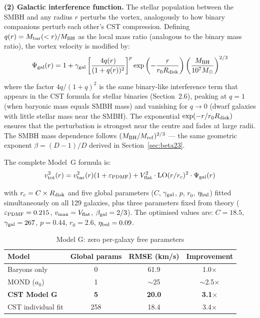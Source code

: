 \documentclass[11pt,a4paper]{article}
\begin{document}
\textbf{(2) Galactic interference function.} The stellar population between the SMBH and any radius $r$ perturbs the vortex, analogously to how binary companions perturb each other's CST compression. Defining $q(r) = M_{\rm bar}(<r)/M_{\rm BH}$ as the local mass ratio (analogous to the binary mass ratio), the vortex velocity is modified by:
\begin{equation}\label{eq:psi_gal}
\Psi_{\rm gal}(r) = 1 + \gamma_{\rm gal} \left[\frac{4q(r)}{(1+q(r))^2}\right]^{p} \exp\left(-\frac{r}{r_0 R_{\rm disk}}\right) \left(\frac{M_{\rm BH}}{10^7 M_\odot}\right)^{2/3}
\end{equation}

where the factor $4q/(1+q)^2$ is the same binary-like interference term that appears in the CST formula for stellar binaries (Section~2.6), peaking at $q = 1$ (when baryonic mass equals SMBH mass) and vanishing for $q \to 0$ (dwarf galaxies with little stellar mass near the SMBH). The exponential $\exp(-r/r_0 R_{\rm disk})$ ensures that the perturbation is strongest near the centre and fades at large radii. The SMBH mass dependence follows $(M_{\rm BH}/M_{\rm ref})^{2/3}$ --- the same geometric exponent $\beta = (D-1)/D$ derived in Section~\ref{sec:beta23}.

The complete Model~G formula is:
\begin{equation}
v_{\rm tot}^2(r) = v_{\rm bar}^2(r)(1 + \varepsilon_{\rm PDMF}) + V_{\rm flat}^2 \cdot {\rm LO}(r/r_c)^2 \cdot \Psi_{\rm gal}(r)
\end{equation}

with $r_c = C \times R_{\rm disk}$ and five global parameters ($C$, $\gamma_{\rm gal}$, $p$, $r_0$, $\eta_{\rm bul}$) fitted simultaneously on all 129 galaxies, plus three parameters fixed from theory ($\varepsilon_{\rm PDMF} = 0.215$, $v_{\rm max} = V_{\rm flat}$, $\beta_{\rm gal} = 2/3$). The optimised values are: $C = 18.5$, $\gamma_{\rm gal} = 267$, $p = 0.44$, $r_0 = 2.6$, $\eta_{\rm bul} = 0.09$.

\begin{table}[h]
\centering
\caption{Model G: zero per-galaxy free parameters}
\begin{tabular}{lccc}
\toprule
Model & Global params & RMSE (km/s) & Improvement \\
\midrule
Baryons only & 0 & 61.9 & 1.0$\times$ \\
MOND ($a_0$) & 1 & $\sim$25 & $\sim$2.5$\times$ \\
\textbf{CST Model G} & \textbf{5} & \textbf{20.0} & \textbf{3.1$\times$} \\
CST individual fit & 258 & 18.4 & 3.4$\times$ \\
\bottomrule
\end{tabular}
\end{table}
\end{document}
